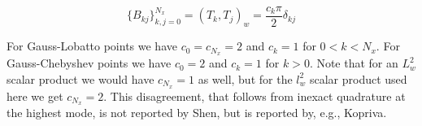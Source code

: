 \documentclass[11pt, oneside]{article}
\begin{document}
\begin{equation}
 \{B_{kj}\}_{k,j=0}^{N_x} = (T_k, T_j)_w = \frac{c_k \pi}{2} \delta_{kj}
\end{equation}

For Gauss-Lobatto points we have $c_0=c_{N_x}=2$ and $c_k=1$ for $0<k<N_x$. For Gauss-Chebyshev points we have $c_0=2$ and $c_k=1$ for $k>0$. Note that for an $L^2_w$ scalar product we would have $c_{N_x}=1$ as well, but for the $l^2_w$ scalar product used here we get $c_{N_x}=2$. This disagreement, that follows from inexact quadrature at the highest mode, is not reported by Shen, but is reported by, e.g., Kopriva.
\end{document}
